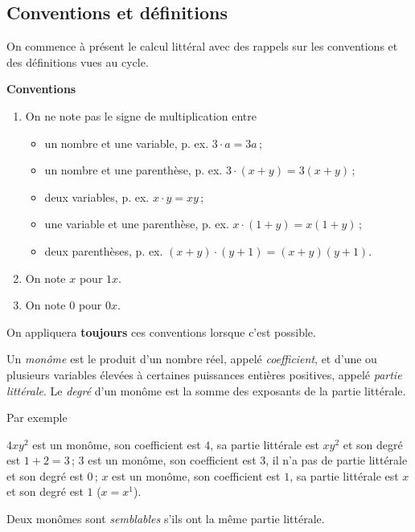 \documentclass[a4paper,12pt]{report}
\begin{document}
\subsection{Conventions et définitions}
On commence à présent le calcul littéral avec des rappels sur les conventions et des définitions vues au cycle.
\begin{center}
{\bfseries Conventions}
\begin{enumerate}
	\item[] On ne note pas le signe de multiplication entre 
		\begin{itemize}
			\item un nombre et une variable, p. ex. $3\cdot a =3a$\,;
			\item un nombre et une parenthèse, p. ex. $3\cdot (x+y)=3(x+y)$\,;
			\item deux variables, p. ex. $x\cdot y=xy$\,;
			\item une variable et une parenthèse, p. ex. $x\cdot (1+y)=x(1+y)$\,;
			\item deux parenthèses, p. ex. $(x+y)\cdot (y+1)=(x+y)(y+1)$.
		\end{itemize}
	\item[] On note $x$ pour $1x$.
	\item[] On note $0$ pour $0x$.
\end{enumerate}
	\end{center}
	\begin{rem}
		On appliquera {\bfseries toujours} ces conventions lorsque c'est possible.
	\end{rem}
\begin{defi}[monôme]
	Un \emph{monôme} est le produit d'un nombre réel, appelé  \emph{coefficient}, et d'une ou plusieurs variables élevées à certaines puissances entières positives, appelé \emph{partie littérale}. Le \emph{degré} d'un monôme est la somme des exposants de la partie littérale.
\end{defi}
Par exemple
\begin{tasks}
	\task $4xy^2$ est un monôme, son coefficient est $4$, sa partie littérale est $xy^2$ et son degré est $1+2=3$\,; 
	\task $3$ est un monôme, son coefficient est $3$, il n'a pas de partie littérale et son degré est $0$\,;
	\task $x$ est un monôme, son coefficient est $1$, sa partie littérale est $x$ et son degré est $1$ ($x=x^1$). 
\end{tasks}
\begin{defi}
	Deux monômes sont \emph{semblables} s'ils ont la même partie littérale.
\end{defi}
\end{document}
